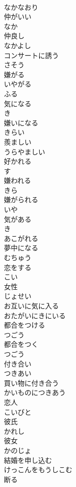 \documentclass[8pt]{extreport}
\begin{document}
\begin{CJK}{UTF8}{min}
\\	なかなおり
\\	仲がいい	
\\	なか
\\	仲良し	
\\	なかよし
\\	コンサートに誘う	
\\	さそう
\\	嫌がる	
\\	いやがる
\\	ふる	
\\	気になる	
\\	き
\\	嫌いになる	
\\	きらい
\\	羨ましい	
\\	うらやましい
\\	好かれる	
\\	す
\\	嫌われる	
\\	きら
\\	嫌がられる	
\\	いや
\\	気がある	
\\	き
\\	あこがれる	
\\	夢中になる	
\\	むちゅう
\\	恋をする	
\\	こい
\\	女性	
\\	じょせい
\\	お互いに気に入る	
\\	おたがいにきにいる
\\	都合をつける	
\\	つごう
\\	都合をつく	
\\	つごう
\\	付き合い	
\\	つきあい
\\	買い物に付き合う	
\\	かいものにつきあう
\\	恋人	
\\	こいびと
\\	彼氏	
\\	かれし
\\	彼女	
\\	かのじょ
\\	結婚を申し込む	
\\	けっこんをもうしこむ
\\	断る	

\end{CJK}
\end{document}
